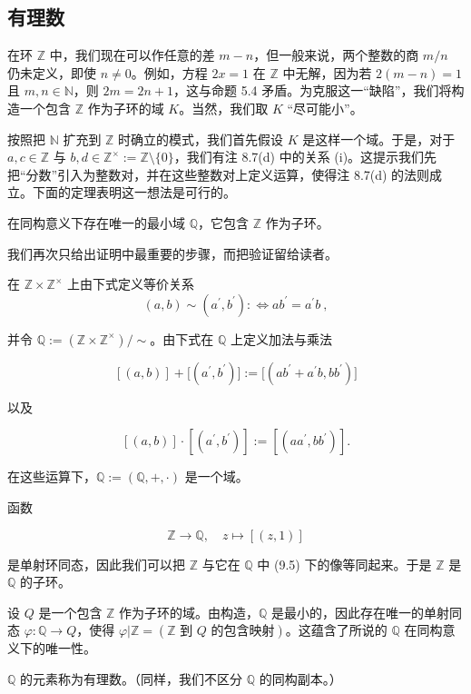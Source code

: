 \subsection*{有理数}

在环 $ \mathbb{Z} $ 中，我们现在可以作任意的差 $ m - n $，但一般来说，两个整数的商 $ m/n $ 仍未定义，即使 $ n \neq 0 $。例如，方程 $ 2x = 1 $ 在 $ \mathbb{Z} $ 中无解，因为若 $ 2(m - n) = 1 $ 且 $ m, n \in \mathbb{N} $，则 $ 2m = 2n + 1 $，这与命题 5.4 矛盾。为克服这一“缺陷”，我们将构造一个包含 $ \mathbb{Z} $ 作为子环的域 $ K $。当然，我们取 $ K $ “尽可能小”。

按照把 $ \mathbb{N} $ 扩充到 $ \mathbb{Z} $ 时确立的模式，我们首先假设 $ K $ 是这样一个域。于是，对于 $ a, c \in \mathbb{Z} $ 与 $ b, d \in \mathbb{Z}^\times := \mathbb{Z} \setminus \{0\} $，我们有注 8.7(d) 中的关系 (i)。这提示我们先把“分数”引入为整数对，并在这些整数对上定义运算，使得注 8.7(d) 的法则成立。下面的定理表明这一想法是可行的。

\begin{theorem}

在同构意义下存在唯一的最小域 $ \mathbb{Q} $，它包含 $ \mathbb{Z} $ 作为子环。

\proofhead
我们再次只给出证明中最重要的步骤，而把验证留给读者。

在 $ \mathbb{Z} \times \mathbb{Z}^\times $ 上由下式定义等价关系
\[
(a,b)\sim(a^{\prime},b^{\prime}):\Longleftrightarrow a b^{\prime}=a^{\prime}b~,
\]

并令 $ \mathbb{Q} := (\mathbb{Z} \times \mathbb{Z}^\times) / \sim $。由下式在 $ \mathbb{Q} $ 上定义加法与乘法

\[
[(a,b)]+\big[(a^{\prime},b^{\prime})\big]:=\big[(a b^{\prime}+a^{\prime}b,b b^{\prime})\big]
\]

以及

\[
\left[(a,b)\right]\cdot\left[(a^{\prime},b^{\prime})\right]:=\left[(aa^{\prime},bb^{\prime})\right].
\]

在这些运算下，$ \mathbb{Q} := (\mathbb{Q}, +, \cdot) $ 是一个域。

函数

\begin{equation}
\mathbb{Z}\to\mathbb{Q},\quad z\mapsto\left[(z,1)\right]
\end{equation}

是单射环同态，因此我们可以把 $ \mathbb{Z} $ 与它在 $ \mathbb{Q} $ 中 (9.5) 下的像等同起来。于是 $ \mathbb{Z} $ 是 $ \mathbb{Q} $ 的子环。

设 $ Q $ 是一个包含 $ \mathbb{Z} $ 作为子环的域。由构造，$ \mathbb{Q} $ 是最小的，因此存在唯一的单射同态 $ \varphi: \mathbb{Q} \to Q $，使得 $ \varphi | \mathbb{Z} = (\mathbb{Z} \text{ 到 } Q \text{ 的包含映射}) $。这蕴含了所说的 $ \mathbb{Q} $ 在同构意义下的唯一性。

$ \mathbb{Q} $ 的元素称为有理数。（同样，我们不区分 $ \mathbb{Q} $ 的同构副本。）

\end{theorem}

